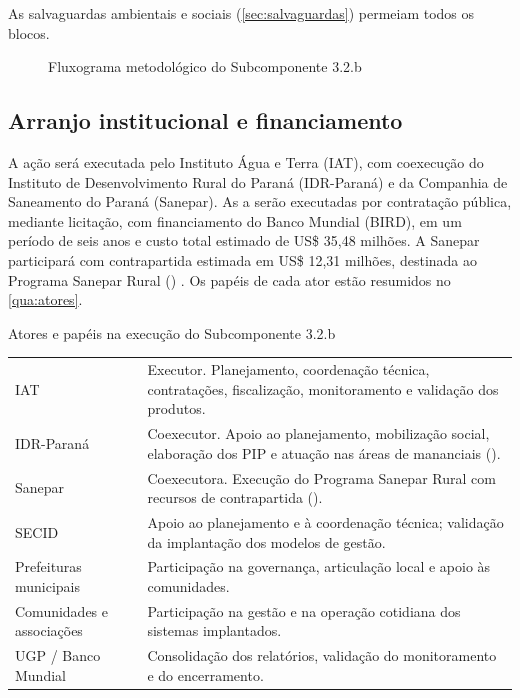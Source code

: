 As salvaguardas ambientais e sociais (\autoref{sec:salvaguardas}) permeiam
todos os blocos.

\begin{figure}[htbp]
  \centering
  \caption{Fluxograma metodológico do Subcomponente 3.2.b}
  \label{fig:fluxograma-geral}
  
\end{figure}

\subsection{Arranjo institucional e financiamento}
\label{subsec:arranjo}

A ação será executada pelo Instituto Água e Terra (IAT), com coexecução do
Instituto de Desenvolvimento Rural do Paraná (IDR-Paraná) e da Companhia de
Saneamento do Paraná (Sanepar). As  a 
serão executadas por contratação pública, mediante licitação, com
financiamento do Banco Mundial (BIRD), em um período de seis anos e custo
total estimado de US\$ 35,48 milhões. A Sanepar participará com contrapartida
estimada em US\$ 12,31 milhões, destinada ao Programa Sanepar Rural
() \cite{mop2026}. Os papéis de cada ator estão resumidos
no \autoref{qua:atores}.

\begin{quadro}[htbp]
\caption{Atores e papéis na execução do Subcomponente 3.2.b}
\label{qua:atores}
\small
\renewcommand{\arraystretch}{1.2}
\begin{tabularx}{\textwidth}{|P{3.6cm}|L|}
\hline
{} &  \\ \hline
IAT & Executor. Planejamento, coordenação técnica, contratações, fiscalização,
      monitoramento e validação dos produtos. \\ \hline
IDR-Paraná & Coexecutor. Apoio ao planejamento, mobilização social,
      elaboração dos PIP e atuação nas áreas de mananciais
      (). \\ \hline
Sanepar & Coexecutora. Execução do Programa Sanepar Rural com recursos de
      contrapartida (). \\ \hline
SECID & Apoio ao planejamento e à coordenação técnica; validação da
      implantação dos modelos de gestão. \\ \hline
Prefeituras municipais & Participação na governança, articulação local e
      apoio às comunidades. \\ \hline
Comunidades e associações & Participação na gestão e na operação cotidiana
      dos sistemas implantados. \\ \hline
UGP / Banco Mundial & Consolidação dos relatórios, validação do
      monitoramento e do encerramento. \\ \hline
\end{tabularx}
\end{quadro}

